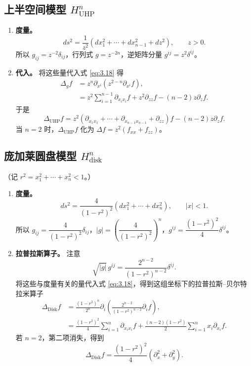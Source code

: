 \subsection{上半空间模型 \texorpdfstring{$H^n_{\mathrm{UHP}}$}{Hⁿ UHP}}
\begin{enumerate}
\item \textbf{度量。}
\[
  ds^2=\frac{1}{z^2}(dx_1^2+\cdots+dx_{n-1}^2+dz^2),\qquad z>0.
\]
所以 $g_{ij}=z^{-2}\delta_{ij}$，行列式 $g=z^{-2n}$，逆矩阵分量 $g^{ij}=z^2\delta^{ij}$。
\item \textbf{代入。}
将这些量代入式 \eqref{eq:3.18} 得
\begin{align*}
  \Delta_g f
   &=z^n\partial_{x^i}(z^{2-n}\partial_{x^i} f),\\
   &=z^2\sum_{i=1}^{n-1}\partial_{x_ix_i}f+z^2\partial_{zz}f-(n-2)z\partial_z f.
\end{align*}
于是
\begin{equation*}
 \Delta_{\mathrm{UHP}} f
    =z^2(\partial_{x_1x_1}+\cdots+\partial_{x_{n-1}x_{n-1}}+\partial_{zz})f
     -(n-2)z\partial_z f.
 \tag{3.19}\label{eq:3.19}
\end{equation*}
当 $n=2$ 时，$\Delta_{\mathrm{UHP}} f$ 化为 $\Delta f=z^2(f_{xx}+f_{zz})$。
\end{enumerate}

\subsection{庞加莱圆盘模型 \texorpdfstring{$H^n_{\mathrm{disk}}$}{Hⁿ disk}}
（记 $r^2=x_1^2+\cdots+x_n^2<1$。）
\begin{enumerate}
\item \textbf{度量。}
\[
  ds^2=\frac{4}{(1-r^2)^2}(dx_1^2+\cdots+dx_n^2),\qquad |x|<1.
\]
所以 $g_{ij}=\dfrac{4}{(1-r^2)^2}\delta_{ij}$，$|g|=\left(\dfrac{4}{(1-r^2)^2}\right)^n$，$g^{ij}=\dfrac{(1-r^2)^2}{4}\delta^{ij}$。
\item \textbf{拉普拉斯算子。}
注意
\[
  \sqrt{|g|}\,g^{ij}=\frac{2^{n-2}}{(1-r^2)^{n-2}}\delta^{ij}.
\]
将这些与度量有关的量代入式 \eqref{eq:3.18}，得到这组坐标下的拉普拉斯–贝尔特拉米算子
\begin{equation*}
\begin{aligned}
  \Delta_{\mathrm{Disk}}f
   &=\frac{(1-r^2)^n}{2^n}\partial_i
      \left(\frac{2^{n-2}}{(1-r^2)^{n-2}}\partial_i f\right),\\
   &=\frac{(1-r^2)^2}{4}\sum_{i=1}^n\partial_{x_ix_i}f
     +\frac{(n-2)(1-r^2)}2\sum_{i=1}^nx_i\partial_{x_i}f.
\end{aligned}
\tag{3.20}\label{eq:3.20}
\end{equation*}
若 $n=2$，第二项消失，得到%
%
\[
  \Delta_{\mathrm{Disk}}f=\frac{(1-r^2)^2}{4}(\partial_x^2+\partial_y^2).
\]
\end{enumerate}


